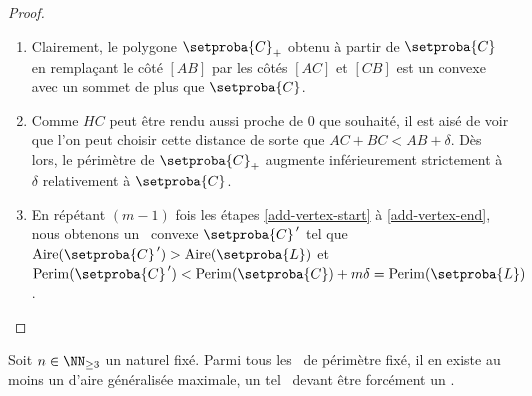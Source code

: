 \begin{proof}
\begin{enumerate}
		\item Clairement, le polygone $\setproba{C}_+$ obtenu à partir de $\setproba{C}$ en remplaçant le côté $[AB]$ par les côtés $[AC]$ et $[CB]$ est un convexe avec un sommet de plus que $\setproba{C}$.

		\item \label{add-vertex-end}
		Comme $HC$ peut être rendu aussi proche de $0$ que souhaité, il est aisé de voir que l'on peut choisir cette distance de sorte que $AC + BC < AB + \delta$.
		Dès lors, le périmètre de $\setproba{C}_+$ augmente inférieurement strictement à $\delta$ relativement à $\setproba{C}$.

		\item En répétant $(m-1)$ fois les étapes \ref{add-vertex-start} à \ref{add-vertex-end}, nous obtenons un \ngone\ convexe $\setproba{C}^{\,\prime}$ tel que
		$\area{\setproba{C}^{\,\prime}} > \area{\setproba{L}}$
		et
		$\perim{\setproba{C}^{\,\prime}} < \perim{\setproba{C}} + m \delta = \perim{\setproba{L}}$.
	\end{enumerate}
\end{proof}




\begin{fact} \label{suff-cond}
    Soit $n \in \NN_{\geq3}$ un naturel fixé.
    Parmi tous les \ncycles\ de périmètre fixé, il en existe au moins un d'aire généralisée maximale, un tel \ncycle\ devant être forcément un \ngone.
\end{fact}


